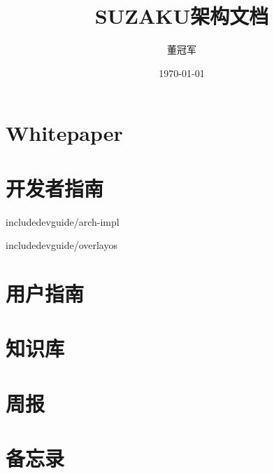 \documentclass[UTF8,oneside]{ctexbook}
\title{SUZAKU架构文档}
\author{董冠军}
\date{\today}
\begin{document}
\maketitle
\tableofcontents

\listoftodos[Notes]

\part{Whitepaper}





\part{开发者指南}

include{devguide/arch-impl}

include{devguide/overlayos}
%
%
%
%

% 
% 




% 
% 

\part{用户指南}







%
%
%
%

\part{知识库}




%
%
%

\part{周报}




\part{备忘录}


% 
% 

\end{document}

